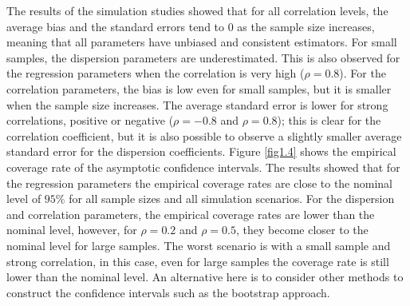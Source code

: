 \documentclass[useAMS,referee]{biom}
\begin{document}
The results of the simulation studies showed that for all correlation levels, the average bias and the standard errors tend to 0 as the sample size increases, meaning that all parameters have unbiased and consistent estimators. For small samples, the dispersion parameters are underestimated. This is also observed for the regression parameters when the correlation is very high ($\rho = 0.8$). For the correlation parameters, the bias is low even for small samples, but it is smaller when the sample size increases. The average standard error is lower for strong correlations, positive or negative ($\rho = -0.8$ and $\rho = 0.8$); this is clear for the correlation coefficient, but it is also possible to observe a slightly smaller average standard error for the dispersion coefficients.
Figure \ref{fig1.4} shows the empirical coverage rate of the asymptotic confidence intervals. The results showed that for the regression parameters the empirical coverage rates are close to the nominal level of $95\%$ for all sample sizes and all simulation scenarios. For the dispersion and correlation parameters, the empirical coverage rates are lower than the nominal level, however, for $\rho = 0.2$ and $\rho = 0.5$, they become closer to the nominal level for large samples. The worst scenario is with a small sample and strong correlation, in this case, even for large samples the coverage rate is still lower than the nominal level. An alternative here is to consider other methods to construct the confidence intervals such as the bootstrap approach. 
\end{document}

